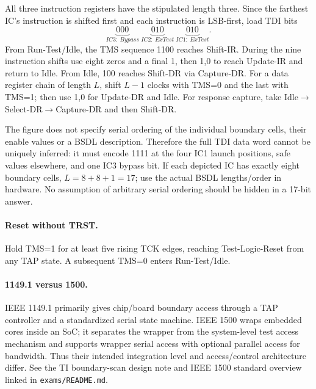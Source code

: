 \documentclass[11pt]{article}
\begin{document}
All three instruction registers have the stipulated length three.
Since the farthest IC's instruction is shifted first and each instruction is
LSB-first, load TDI bits
\[
\underbrace{000}_{IC3:\ Bypass}
\ \underbrace{010}_{IC2:\ ExTest}
\ \underbrace{010}_{IC1:\ ExTest}.
\]
From Run-Test/Idle, the TMS sequence 1100 reaches Shift-IR.
During the nine instruction shifts use eight zeros and a final 1, then 1,0
to reach Update-IR and return to Idle.
From Idle, 100 reaches Shift-DR via Capture-DR.
For a data register chain of length $L$, shift $L-1$ clocks with TMS=0 and the
last with TMS=1; then use 1,0 for Update-DR and Idle.
For response capture, take Idle$\to$Select-DR$\to$Capture-DR and then Shift-DR.

The figure does not specify serial ordering of the individual boundary cells,
their enable values or a BSDL description. Therefore the full TDI data word
cannot be uniquely inferred: it must encode 1111 at the four IC1 launch positions,
safe values elsewhere, and one IC3 bypass bit. If each depicted IC has exactly
eight boundary cells, $L=8+8+1=17$; use the actual BSDL lengths/order in hardware.
No assumption of arbitrary serial ordering should be hidden in a 17-bit answer.

\paragraph{Reset without TRST.}
Hold TMS=1 for at least five rising TCK edges, reaching Test-Logic-Reset
from any TAP state. A subsequent TMS=0 enters Run-Test/Idle.

\paragraph{1149.1 versus 1500.}
IEEE 1149.1 primarily gives chip/board boundary access through a TAP controller
and a standardized serial state machine. IEEE 1500 wraps embedded cores inside
an SoC; it separates the wrapper from the system-level test access mechanism
and supports wrapper serial access with optional parallel access for bandwidth.
Thus their intended integration level and access/control architecture differ.
See the TI boundary-scan design note and IEEE 1500 standard overview linked in
\texttt{exams/README.md}.
\end{document}
